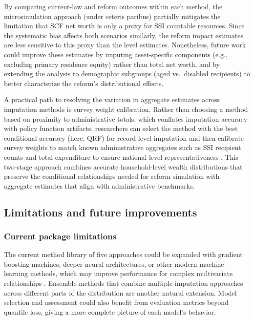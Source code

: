 By comparing current-law and reform outcomes within each method, the microsimulation approach (under ceteris paribus) partially mitigates the limitation that SCF net worth is only a proxy for SSI countable resources. Since the systematic bias affects both scenarios similarly, the reform impact estimates are less sensitive to this proxy than the level estimates. Nonetheless, future work could improve these estimates by imputing asset-specific components (e.g., excluding primary residence equity) rather than total net worth, and by extending the analysis to demographic subgroups (aged vs.\ disabled recipients) to better characterize the reform's distributional effects.

A practical path to resolving the variation in aggregate estimates across imputation methods is survey weight calibration. Rather than choosing a method based on proximity to administrative totals, which conflates imputation accuracy with policy function artifacts, researchers can select the method with the best conditional accuracy (here, QRF) for record-level imputation and then calibrate survey weights to match known administrative aggregates such as SSI recipient counts and total expenditure to ensure national-level representativeness \citep{woodruff2024enhancing}. This two-stage approach combines accurate household-level wealth distributions that preserve the conditional relationships needed for reform simulation with aggregate estimates that align with administrative benchmarks.

\subsection{Limitations and future improvements}\label{sec:limitations}

\subsubsection{Current package limitations}

The current method library of five approaches could be expanded with gradient boosting machines, deeper neural architectures, or other modern machine learning methods, which may improve performance for complex multivariate relationships \citep{alaa2024deep}. Ensemble methods that combine multiple imputation approaches across different parts of the distribution are another natural extension. Model selection and assessment could also benefit from evaluation metrics beyond quantile loss, giving a more complete picture of each model's behavior.

